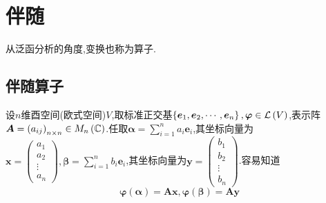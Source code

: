 \newpage
\section{伴随}
从泛函分析的角度,变换也称为算子.
\subsection{伴随算子}
设$n$维酉空间(欧式空间)$V$,取标准正交基$\left\{
    \bm{e}_1,\bm{e}_2,\cdots,\bm{e}_n
    \right\},\bm{\varphi}\in \mathcal{L} \left(V\right)$,表示阵$\displaystyle\bm{A}=\left(a_{ij}\right)_{n\times n}\in M_n\left(\mathbb{C} \right)$.任取$\displaystyle\bm{\alpha}=\sum_{i=1}^{n}a_i\bm{e}_i$,其坐标向量为$\bm{x}=\begin{pmatrix}
        a_1 \\a_2\\\vdots\\a_n
    \end{pmatrix},
    \bm{\beta}=\sum_{i=1}^{n}b_i\bm{e}_i
$,其坐标向量为$\bm{y}=\begin{pmatrix}
        b_1 \\b_2\\\vdots\\b_n
    \end{pmatrix}$.容易知道\[
    \bm{\varphi}\left(\bm{\alpha}\right)=\bm{Ax},\bm{\varphi}\left(\bm{\beta}\right)=\bm{Ay}
\]

